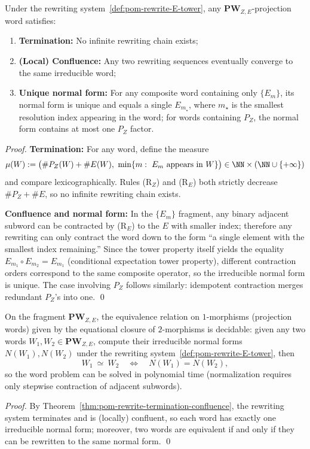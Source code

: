 \begin{theorem}\label{thm:pom-rewrite-termination-confluence}
Under the rewriting system~\ref{def:pom-rewrite-E-tower}, any $\mathbf{PW}_{Z,E}$-projection word satisfies:
\begin{enumerate}
  \item \textbf{Termination:} No infinite rewriting chain exists;
  \item \textbf{(Local) Confluence:} Any two rewriting sequences eventually converge to the same irreducible word;
  \item \textbf{Unique normal form:} For any composite word containing only $\{E_m\}$, its normal form is unique and equals a single $E_{m_\star}$, where $m_\star$ is the smallest resolution index appearing in the word; for words containing $P_Z$, the normal form contains at most one $P_Z$ factor.
\end{enumerate}
\end{theorem}
\begin{proof}
\textbf{Termination:} For any word, define the measure
\[
\mu(W):=\bigl(\#P_Z(W)+\#E(W),\ \min\{m:\ E_m\ \text{appears in}\ W\}\bigr)\in\NN\times(\NN\cup\{+\infty\})
\]
and compare lexicographically. Rules (R$_Z$) and (R$_E$) both strictly decrease $\#P_Z+\#E$, so no infinite rewriting chain exists.

\textbf{Confluence and normal form:} In the $\{E_m\}$ fragment, any binary adjacent subword can be contracted by (R$_E$) to the $E$ with smaller index; therefore any rewriting can only contract the word down to the form ``a single element with the smallest index remaining.'' Since the tower property itself yields the equality $E_{m_1}\circ E_{m_2}=E_{m_1}$ (conditional expectation tower property), different contraction orders correspond to the same composite operator, so the irreducible normal form is unique. The case involving $P_Z$ follows similarly: idempotent contraction merges redundant $P_Z$'s into one. \qed
\end{proof}

\begin{proposition}[Decidability of Equality in the Semiring Closure: Normal Form \texorpdfstring{$\Rightarrow$}{=>} Decidable Word Problem]\label{prop:pom-projword-decidable}
On the fragment $\mathbf{PW}_{Z,E}$, the equivalence relation on $1$-morphisms (projection words) given by the equational closure of $2$-morphisms is decidable: given any two words $W_1,W_2\in\mathbf{PW}_{Z,E}$, compute their irreducible normal forms $N(W_1),N(W_2)$ under the rewriting system~\ref{def:pom-rewrite-E-tower}, then
\[
W_1\ \simeq\ W_2\quad\Longleftrightarrow\quad N(W_1)=N(W_2),
\]
so the word problem can be solved in polynomial time (normalization requires only stepwise contraction of adjacent subwords).
\end{proposition}
\begin{proof}
By Theorem~\ref{thm:pom-rewrite-termination-confluence}, the rewriting system terminates and is (locally) confluent, so each word has exactly one irreducible normal form; moreover, two words are equivalent if and only if they can be rewritten to the same normal form. \qed
\end{proof}

